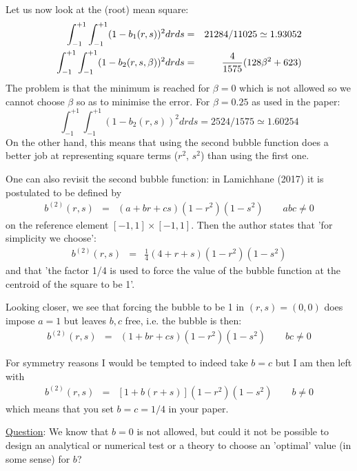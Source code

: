 Let us now look at the (root) mean square:
\begin{eqnarray}
\int_{-1}^{+1} \int_{-1}^{+1} (1-b_1(r,s))^2 dr ds &=& 21284/11025 \simeq 1.93052 \nonumber\\
\int_{-1}^{+1} \int_{-1}^{+1} (1-b_2(r,s,\beta))^2 dr ds &=& \frac{4}{1575} (128 \beta^2  + 623) 
\end{eqnarray}
The problem is that the minimum is reached for $\beta=0$ which is not allowed so 
we cannot choose $\beta$ so as to minimise the error.
For $\beta=0.25$ as used in the paper:
\[
\int_{-1}^{+1} \int_{-1}^{+1} (1-b_2(r,s))^2 dr ds = 2524/1575 \simeq 1.60254 
\]
On the other hand, this means that using the second bubble function does a better job  
at representing square terms ($r^2$, $s^2$) than using the first one. 










\newpage
One can also revisit the second bubble function: in Lamichhane (2017) \cite{lami17}
it is postulated to be defined by 
\begin{eqnarray}
b^{(2)}(r,s) &=& (a+br+cs)(1-r^2)(1-s^2) \qquad abc\neq 0
\end{eqnarray}
on the reference element $[-1,1]\times [-1,1]$. Then the author 
states that 'for simplicity we choose':
\begin{eqnarray}
b^{(2)}(r,s) &=& \frac{1}{4} (4+r+s)(1-r^2)(1-s^2) 
\end{eqnarray}
and that 'the factor 1/4 is used to force the value of the bubble function at
the centroid of the square to be 1'.

Looking closer, we see that forcing the bubble to be 1 in $(r,s)=(0,0)$ does impose
$a=1$ but leaves $b,c$ free, i.e. the bubble is then:
\begin{eqnarray}
b^{(2)}(r,s) &=& (1+br+cs)(1-r^2)(1-s^2) \qquad bc\neq 0
\end{eqnarray}

For symmetry reasons I would be tempted to indeed take $b=c$ but I am then left with 
\begin{eqnarray}
b^{(2)}(r,s) &=&  [1+b(r+s)](1-r^2)(1-s^2) \qquad b\neq 0
\end{eqnarray}
which means that you set $b=c=1/4$ in your paper. 

\underline{Question}: We know that $b=0$ is not allowed, but could it not be 
possible to design an analytical or numerical test or a 
theory to choose an 'optimal' value (in some sense) for $b$?  









